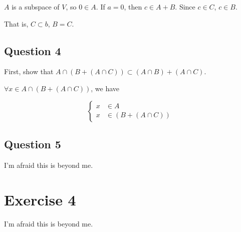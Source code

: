 \documentclass{article}
\begin{document}
$A$ is a subspace of $V$, so $0\in A$. If $a=0$, then $c\in A+B$. Since $c\in C$, $c\in B$.

That is, $C\subset b$, $B=C$.

\subsection{Question 4}

First, show that $A\cap (B+(A\cap C))\subset (A\cap B)+(A\cap C)$.

$\forall x\in A\cap (B+(A\cap C))$, we have

\begin{equation*}
    \left\{\begin{aligned}
        x & \in A             \\
        x & \in (B+(A\cap C))
    \end{aligned}
    \right.
\end{equation*}

\subsection{Question 5}

I'm afraid this is beyond me.

\section{Exercise 4}

I'm afraid this is beyond me.
\end{document}
